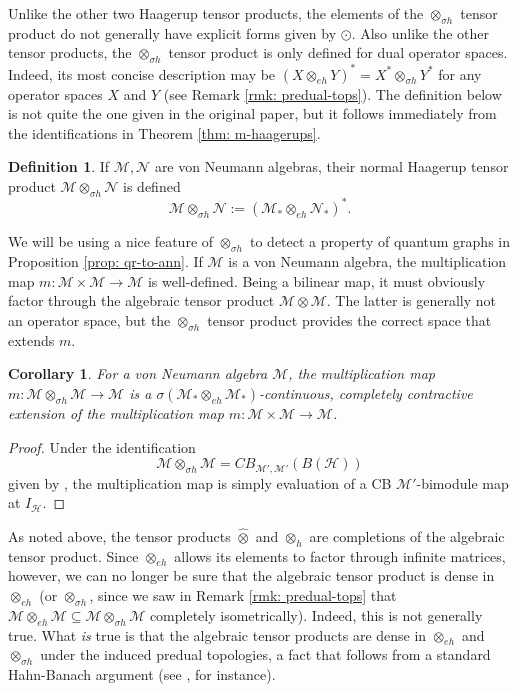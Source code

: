 \documentclass[12pt]{article}
\newtheorem{corollary}[theorem]{Corollary}
\theoremstyle{definition}
\newtheorem{definition}[theorem]{Definition}
\newenvironment{remark}
  {\pushQED{\qed}\renewcommand{\qedsymbol}{\textcircled{\tiny R}}\remarkx}
  {\popQED\endremarkx}
\newcommand{\mc}[1]{\mathcal{#1}}
\newcommand{\<}{\langle}
\renewcommand{\>}{\rangle}
\renewcommand{\hat}[1]{\widehat{#1}}
\renewcommand{\subset}{\subseteq}
\newcommand{\eh}{\otimes_{eh}}
\begin{document}
Unlike the other two Haagerup tensor products, the elements of the $\otimes_{\sigma h}$ tensor product do not generally have explicit forms given by $\odot$. Also unlike the other tensor products, the $\otimes_{\sigma h}$ tensor product is only defined for dual operator spaces. Indeed, its most concise description may be $(X \eh Y)^* = X^* \otimes_{\sigma h} Y^*$ for any operator spaces $X$ and $Y$ (see Remark \ref{rmk: predual-tops}). The definition below is not quite the one given in the original paper, but it follows immediately from the identifications in Theorem \ref{thm: m-haagerups}.

\begin{definition} \cite[p. 262]{normal-haagerup}
    If $\mc M, \mc N$ are von Neumann algebras, their normal Haagerup tensor product $\mc M \otimes_{\sigma h} \mc N$ is defined
    \[
    \mc M \otimes_{\sigma h} \mc N := (\mc M_* \eh \mc N _*)^{*}.
    \]
\end{definition}

We will be using a nice feature of $\otimes_{\sigma h}$ to detect a property of quantum graphs in Proposition \ref{prop: qr-to-ann}. If $\mc M$ is a von Neumann algebra, the multiplication map $m: \mc M \times \mc M \to \mc M$ is well-defined. Being a bilinear map, it must obviously factor through the algebraic tensor product $\mc M \otimes \mc M$. The latter is generally not an operator space, but the $\otimes_{\sigma h}$ tensor product provides the correct space that extends $m$. 

\begin{corollary} \label{cor: sigma-mult}
    For a von Neumann algebra $\mc M$, the multiplication map $m: \mc M \otimes_{\sigma h} \mc M \to \mc M$ is a $\sigma(\mc M_* \eh \mc M_*)$-continuous, completely contractive extension of the multiplication map $m: \mc M \times \mc M \to \mc M$.
\end{corollary}
\begin{proof}
    Under the identification 
    \[
    \mc M \otimes_{\sigma h} \mc M = CB_{\mc M',\mc M'}(B(\mc H))
    \]
    given by \cite[Theorem 2.5]{normal-haagerup}, the multiplication map is simply evaluation of a CB $\mc M'$-bimodule map at $I_{\mc H}$. 
\end{proof}

\begin{remark}
    As noted above, the tensor products $\hat \otimes$ and $\otimes_h$ are completions of the algebraic tensor product. Since $\eh$ allows its elements to factor through infinite matrices, however, we can no longer be sure that the algebraic tensor product is dense in $\eh$ (or $\otimes_{\sigma h}$, since we saw in Remark \ref{rmk: predual-tops} that $\mc M \eh \mc M \subset \mc M \otimes_{\sigma h} \mc M$ completely isometrically). Indeed, this is not generally true. What \textit{is} true is that the algebraic tensor products are dense in $\eh$ and $\otimes_{\sigma h}$ under the induced predual topologies, a fact that follows from a standard Hahn-Banach argument (see \cite[Lemma 2.1]{w*density-haagerup}, for instance).
\end{remark}
\end{document}
